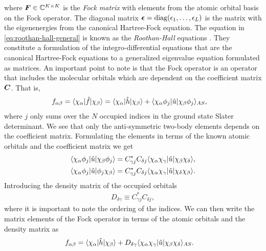             where $\boldsymbol{F} \in \mathbb{C}^{K \times K}$ is the \emph{Fock
            matrix} with elements from the atomic orbital basis on the Fock
            operator.
            The diagonal matrix $\boldsymbol{\epsilon} = \operatorname{diag}(\epsilon_1, \dots,
            \epsilon_L)$ is the matrix with the eigenenergies from the canonical
            Hartree-Fock equation.
            The equation in \autoref{eq:roothan-hall-general} is known as the
            \emph{Roothan-Hall} equations \cite{roothan, hall}.
            They constitute a formulation of the integro-differential equations
            that are the canonical Hartree-Fock equations to a generalized
            eigenvalue equation formulated as matrices.
            An important point to note is that the Fock operator is an operator
            that includes the molecular orbitals which are dependent on the
            coefficient matrix $\boldsymbol{C}$.
            That is,
            \begin{align}
                f_{\alpha\beta}
                &= \langle \chi_{\alpha} |\hat{f}| \chi_{\beta} \rangle
                = \langle \chi_{\alpha} |\hat{h}| \chi_{\beta} \rangle
                +
                \langle \chi_{\alpha}\phi_j |\hat{u}| \chi_{\beta}\phi_j \rangle_{AS},
            \end{align}
            where $j$ only sums over the $N$ occupied indices in the ground state
            Slater determinant.
            We see that only the anti-symmetric two-body elements depends on the
            coefficient matrix.
            Formulating the elements in terms of the known atomic orbitals and
            the coefficient matrix we get
            \begin{align}
                \langle \chi_{\alpha}\phi_j |\hat{u}| \chi_{\beta}\phi_j \rangle
                &=
                C^{*}_{\gamma j} C_{\delta j}
                \langle \chi_{\alpha}\chi_{\gamma} |\hat{u}| \chi_{\beta}\chi_{\delta} \rangle,
                \\
                \langle \chi_{\alpha}\phi_j |\hat{u}| \phi_j\chi_{\beta} \rangle
                &=
                C^{*}_{\gamma j} C_{\delta j}
                \langle \chi_{\alpha}\chi_{\gamma} |\hat{u}| \chi_{\delta}\chi_{\beta} \rangle.
            \end{align}
            Introducing the density matrix of the occupied orbitals
            \begin{align}
                D_{\delta\gamma} \equiv
                C^{*}_{\gamma j} C_{\delta j},
            \end{align}
            where it is important to note the ordering of the indices.
            We can then write the matrix elements of the Fock operator in terms
            of the atomic orbitals and the density matrix as
            \begin{align}
                f_{\alpha\beta}
                &= \langle \chi_{\alpha} |\hat{h}| \chi_{\beta} \rangle
                +
                D_{\delta\gamma}
                \langle \chi_{\alpha}\chi_{\gamma} |\hat{u}| \chi_{\beta}\chi_{\delta} \rangle_{AS}.
            \end{align}

